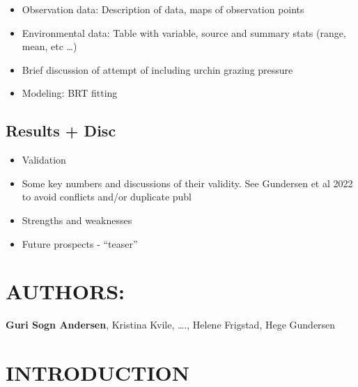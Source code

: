 \documentclass[
]{article}
\providecommand{\tightlist}{%
  \setlength{\itemsep}{0pt}\setlength{\parskip}{0pt}}
\begin{document}
\begin{itemize}
\tightlist
\item
  Observation data: Description of data, maps of observation points
\item
  Environmental data: Table with variable, source and summary stats
  (range, mean, etc \ldots)
\item
  Brief discussion of attempt of including urchin grazing pressure
\item
  Modeling: BRT fitting
\end{itemize}

\hypertarget{results-disc}{%
\subsection{Results + Disc}\label{results-disc}}

\begin{itemize}
\tightlist
\item
  Validation
\item
  Some key numbers and discussions of their validity. See Gundersen et
  al 2022 to avoid conflicts and/or duplicate publ
\item
  Strengths and weaknesses
\item
  Future prospects - ``teaser''
\end{itemize}

\hypertarget{authors}{%
\section{AUTHORS:}\label{authors}}

\textbf{Guri Sogn Andersen}, Kristina Kvile, \ldots., Helene Frigstad,
Hege Gundersen

\hypertarget{introduction-1}{%
\section{INTRODUCTION}\label{introduction-1}}
\end{document}
